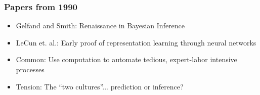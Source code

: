 \documentclass[10pt,mathserif]{beamer}
\begin{document}
\begin{frame}
  \frametitle{Papers from 1990}
  \begin{itemize}
  \item Gelfand and Smith: Renaissance in Bayesian Inference
  \item LeCun et. al.: Early proof of representation learning through neural networks
  \item Common: Use computation to automate tedious, expert-labor intensive processes
  \item Tension: The ``two cultures''... prediction or inference?
  \end{itemize}
  \begin{figure}
  \end{figure}
\end{frame}
\end{document}
